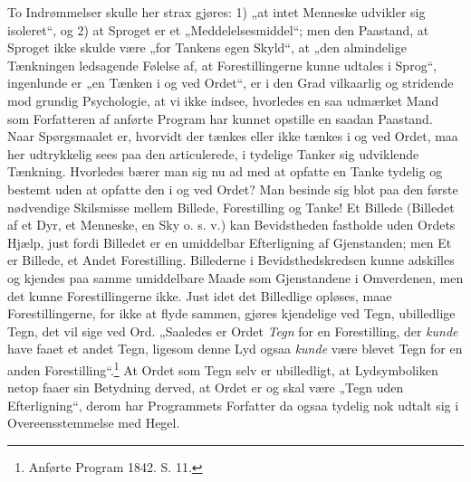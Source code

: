\documentclass[12pt]{book}
\newcommand{\opage}[1]{\marginnote{\footnotesize\textit{[#1]}}}
\begin{document}
To Indrømmelser skulle her strax gjøres: 1) „at intet
Menneske udvikler sig isoleret“, og 2) at Sproget er et „Meddelelsesmiddel“;
men den Paastand, at Sproget ikke skulde
være „for Tankens egen Skyld“, at „den almindelige Tænkningen
ledsagende Følelse af, at Forestillingerne kunne udtales
i Sprog“, ingenlunde er „en Tænken i og ved Ordet“, er i den
Grad vilkaarlig og stridende mod grundig Psychologie, at vi
ikke indsee, hvorledes en saa udmærket Mand som Forfatteren af
anførte Program har kunnet opstille en saadan Paastand. Naar
Spørgsmaalet er, hvorvidt der tænkes eller ikke tænkes i og
ved Ordet, maa her udtrykkelig sees paa den articulerede, i
tydelige Tanker sig udviklende Tænkning. Hvorledes bærer
man sig nu ad med at opfatte en Tanke tydelig og bestemt
uden at opfatte den i og ved Ordet? Man besinde sig blot
paa den første nødvendige Skilsmisse mellem Billede, Forestilling
og Tanke! Et Billede (Billedet af et Dyr, et Menneske,
en Sky o. s. v.) kan Bevidstheden fastholde uden Ordets
Hjælp, just fordi Billedet er en umiddelbar Efterligning af
Gjenstanden; men Et er Billede, et Andet Forestilling.
Billederne i Bevidsthedskredsen kunne adskilles og kjendes paa
samme umiddelbare Maade som Gjenstandene i Omverdenen,
men det kunne Forestillingerne ikke. Just idet det Billedlige
opløses, maae Forestillingerne, for ikke at flyde sammen, gjøres
kjendelige ved Tegn, ubilledlige Tegn, det vil sige ved Ord.
„Saaledes er Ordet \emph{Tegn} for en Forestilling, der \emph{kunde} have
faaet et andet Tegn, ligesom denne Lyd ogsaa \emph{kunde} være
\opage{23}blevet Tegn for en anden Forestilling“.\footnote{Anførte Program 1842. S. 11.}%
At Ordet som
Tegn selv er ubilledligt, at Lydsymboliken netop faaer sin
Betydning derved, at Ordet er og skal være „Tegn uden Efterligning“,
derom har Programmets Forfatter da ogsaa tydelig
nok udtalt sig i Overeensstemmelse med Hegel.
\end{document}
